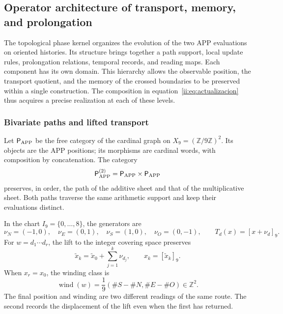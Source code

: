\subsection{Operator architecture of transport, memory, and prolongation}
\label{ii:ii:tpk-arquitectura}

The topological phase kernel organizes the evolution of the two APP
evaluations on oriented histories. Its structure brings together a path support,
local update rules, prolongation relations, temporal
records, and reading maps. Each component has its own
domain. This hierarchy allows the observable position, the transport
quotient, and the memory of the crossed boundaries to be preserved within
a single construction. The composition in equation~\eqref{ii:eq:actualizacion}
thus acquires a precise realization at each of these levels.

\subsubsection{Bivariate paths and lifted transport}

Let \(\mathsf P_{\rm APP}\) be the free category of the cardinal graph on
\(X_9=(\mathbb Z/9\mathbb Z)^2\). Its objects are the APP positions;
its morphisms are cardinal words, with composition by
concatenation. The category
\[
 \mathsf P_{\rm APP}^{(2)}
 =\mathsf P_{\rm APP}\times\mathsf P_{\rm APP}
\]
preserves, in order, the path of the additive sheet and that of the
multiplicative sheet. Both paths traverse the same arithmetic support and
keep their evaluations distinct.

In the chart \(I_9=\{0,\ldots,8\}\), the generators are
\[
 \nu_N=(-1,0),\quad\nu_E=(0,1),\quad
 \nu_S=(1,0),\quad\nu_O=(0,-1),
 \qquad T_d(x)=[x+\nu_d]_9.
\]
For \(w=d_1\cdots d_r\), the lift to the integer covering space preserves
\[
 \widetilde x_k=\widetilde x_0+\sum_{j=1}^{k}\nu_{d_j},
 \qquad x_k=[\widetilde x_k]_9.
\]
When \(x_r=x_0\), the winding class is
\begin{equation}
 \operatorname{wind}(w)
 =\frac{1}{9}(\#S-\#N,\#E-\#O)\in\mathbb Z^2.
 \label{ii:ii:tpk-enrollamiento}
\end{equation}
The final position and winding are two different readings of the
same route. The second records the displacement of the lift even
when the first has returned.

